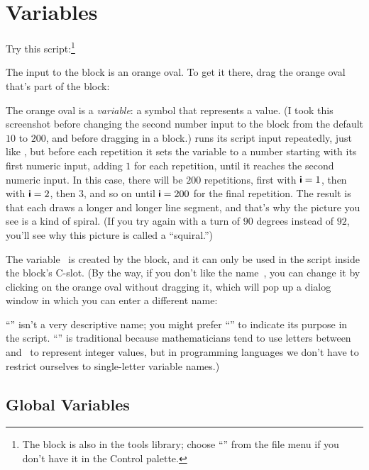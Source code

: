 \documentclass{report}
\begin{document}

\section{Variables}

Try this script:\footnote{The  block is also in the tools library; choose ``'' from the file menu if you don't have it in the Control palette.}


The input to the  block is an orange oval. To get it there, drag the orange oval that's part of the  block:


The orange oval is a \emph{variable}: a symbol that represents a value. (I took this screenshot before changing the second number input to the  block from the default $10$ to $200$, and before dragging in a  block.)  runs its script input repeatedly, just like , but before each repetition it sets the variable  to a number starting with its first numeric input, adding $1$ for each repetition, until it reaches the second numeric input. In this case, there will be $200$ repetitions, first with $\textsf{\textbf{i}}=1$, then with $\textsf{\textbf{i}}=2$, then $3$, and so on until $\textsf{\textbf{i}}=200$ for the final repetition. The result is that each  draws a longer and longer line segment, and that's why the picture you see is a kind of spiral. (If you try again with a turn of $90$ degrees instead of $92$, you'll see why this picture is called a ``squiral.'')

The variable~ is created by the  block, and it can only be used in the script inside the block's C-slot. (By the way, if you don't like the name~, you can change it by clicking on the orange oval without dragging it, which will pop up a dialog window in which you can enter a different name:


``'' isn't a very descriptive name; you might prefer ``'' to indicate its purpose in the script. ``'' is traditional because mathematicians tend to use letters between~ and~ to represent integer values, but in programming languages we don't have to restrict ourselves to single-letter variable names.)

\subsection{Global Variables}
\end{document}
